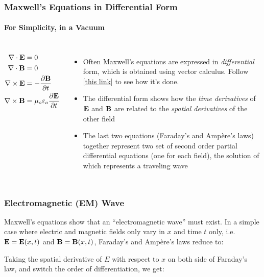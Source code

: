 \documentclass[12pt,aspectratio=169]{beamer}
\newcommand{\eq}[2]{\vspace{#1}{\Large\begin{displaymath}#2\end{displaymath}}}
\begin{document}
\begin{frame}
  \frametitle{Maxwell's Equations in Differential Form}
  \framesubtitle{For Simplicity, in a Vacuum}
  \begin{columns}

    {\Large
      \begin{align*}
        \nabla\cdot\mathbf{E} &= 0\\
        \nabla\cdot\mathbf{B} &= 0\\
        \nabla\times\mathbf{E} &=-\frac{\partial\mathbf{B}}{\partial t}\\
        \nabla\times\mathbf{B} &=\mu_o\varepsilon_o\frac{\partial\mathbf{E}}{\partial t}
      \end{align*}
    }

    \begin{itemize}
    \item Often Maxwell's equations are expressed in \emph{differential} form,
      which is obtained using vector calculus. Follow
      [\underline{\href{https://www.wikihow.com/Convert-Maxwell\%27s-Equations-into-Differential-Form}{this link}}]
      to see how it's done.
    \item The differential form shows how the \emph{time derivatives} of
      $\mathbf{E}$ and $\mathbf{B}$ are related to the \emph{spatial derivatives}
      of the other field
    \item The last two equations (Faraday's and Amp\`{e}re's laws) together
      represent two set of second order partial differential equations (one for
      each field), the solution of which represents a traveling wave
    \end{itemize}
    
  \end{columns}
\end{frame}

\begin{frame}
  \frametitle{Electromagnetic (EM) Wave}
  Maxwell's equations show that an ``electromagnetic wave'' must exist. In a
  simple case where electric and magnetic fields only vary in
  $x$ and time $t$ only, i.e.\ $\mathbf{E}=\mathbf{E}(x,t)$ and $\mathbf{B}=\mathbf{B}(x,t)$,
  Faraday's and Amp\`{e}re's laws reduce to:

  \eq{-.2in}{
    \frac{\partial E}{\partial x}=-\frac{\partial B}{dt}
    \quad\quad
    \frac{\partial B}{\partial x}=-\mu_0\varepsilon_0\frac{\partial E}{dt}
  }

  Taking the spatial derivative of $E$ with respect to $x$ on both
  side of Faraday's law, and switch the order of differentiation, we get:

  \eq{-.3in}{
      \frac{\partial}{\partial x}
      \left(\frac{\partial E}{\partial x}\right)
      =-\frac{\partial}{\partial x}\left(\frac{\partial B}{\partial t}\right)
      \quad\rightarrow\quad
      \frac{\partial^2E}{\partial x^2}=
      -\frac{\partial}{\partial t}\left(\frac{\partial B}{\partial x}\right)
  }
\end{frame}
\end{document}
